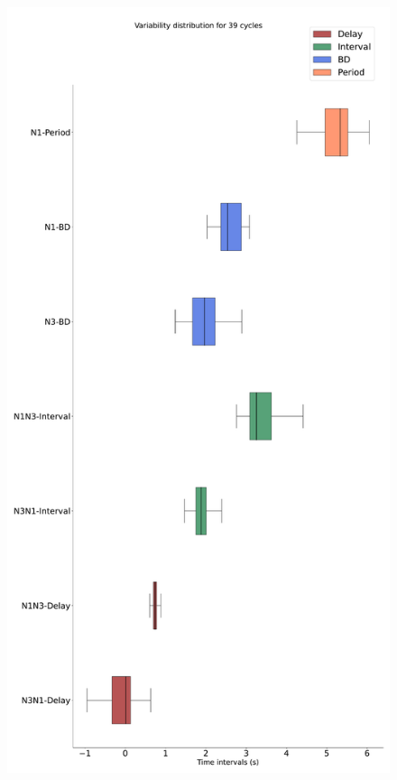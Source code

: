 \begin{figure}[htbp]
\begin{minipage}{0.9\textwidth}
\begin{minipage}[b]{0.43\textwidth}
			\includegraphics[width=\textwidth]{./invariants/data/SUSSEX/CV1a_driven1/images/stim_cv1a1_boxplot.pdf}
		\end{minipage}
		\begin{minipage}[b]{0.55\textwidth}

\end{minipage}
\end{minipage}
\end{figure}
